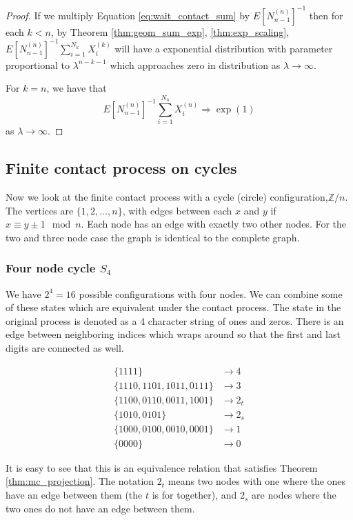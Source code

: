 \documentclass{article}
\theoremstyle{plain}
\theoremstyle{definition}
\theoremstyle{remark}
\numberwithin{equation}{section}
\newcommand{\Z}{\mathbb{Z}}
\begin{document}
\begin{proof}
If we multiply Equation \eqref{eq:wait_contact_sum} by $E[N_{n-1}^{(n)}]^{-1}$ then for each $k < n$, by Theorem \eqref{thm:geom_sum_exp}, \eqref{thm:exp_scaling}, $E[N_{n-1}^{(n)}]^{-1} \sum_{i =
1}^{N_{k}} X_i^{(k)}$ will have a exponential distribution with parameter proportional to $\lambda^{n - k - 1}$ which approaches zero in distribution as $\lambda \to \infty$.

For $k = n$, we have that
$$
E[N_{n-1}^{(n)}]^{-1} \sum_{i =
1}^{N_{n}} X_i^{(n)} \Rightarrow \exp(1)
$$
as $\lambda \to \infty$.
\end{proof}

\subsection{Finite contact process on cycles}

Now we look at the finite contact process with a cycle (circle) configuration,$\Z/n$. The vertices are $\{1, 2,\ldots, n\}$, with edges between each $x$ and $y$ if $x \equiv y \pm 1 \mod n$.
Each node has an edge with exactly two other nodes.
For the two and three node case the graph is identical to the complete graph.


\subsubsection{Four node cycle \texorpdfstring{$S_4$}{S4}}
We have $2^4 = 16$ possible configurations with four nodes.
We can combine some of these states which are equivalent under the contact process.
The state in the original process is denoted as a 4 character string of ones and zeros.
There is an edge between neighboring indices which wraps around so that the first and last digits are connected as well.

\begin{align*}
    \{1111\} &\to 4\\
    \{1110, 1101, 1011, 0111\} &\to 3\\
    \{1100, 0110, 0011, 1001\} &\to 2_t\\
    \{1010, 0101\} &\to 2_s\\
    \{1000, 0100, 0010, 0001\} &\to 1\\
    \{0000\} &\to 0
\end{align*}

It is easy to see that this is an equivalence relation that satisfies Theorem \ref{thm:mc_projection}.
The notation $2_t$ means two nodes with one where the ones have an edge between them (the $t$ is for together),
and $2_s$ are nodes where the two ones do not have an edge between them.
\end{document}
